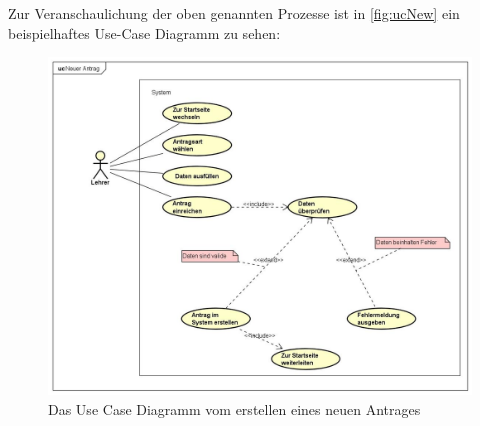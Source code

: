 Zur Veranschaulichung der oben genannten Prozesse ist in \autoref{fig:ucNew} ein beispielhaftes Use-Case Diagramm zu sehen: 
\begin{figure}[H]
	\centering
	\includegraphics[width=1\linewidth]{images/uc-new}
	\caption[Use Case Diagramm Neuer Antrag]{Das Use Case Diagramm vom erstellen eines neuen Antrages}
	\label{fig:ucNew}
\end{figure}
\newpage
